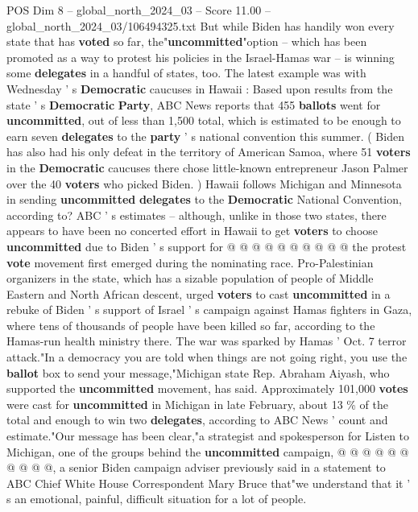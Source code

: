 \begin{textsample}{POS Dim 8 – global\_north\_2024\_03 – Score 11.00 – global\_north\_2024\_03/106494325.txt}  \label{ex:f8_pos_015}
But while Biden has handily won every state that has \textbf{voted} so far, the"\textbf{uncommitted}"option -- which has been promoted as a way to protest his policies in the Israel-Hamas war -- is winning some \textbf{delegates} in a handful of states, too.
The latest example was with Wednesday ' s \textbf{Democratic} caucuses in Hawaii : Based upon results from the state ' s \textbf{Democratic} \textbf{Party}, ABC News reports that 455 \textbf{ballots} went for \textbf{uncommitted}, out of less than 1,500 total, which is estimated to be enough to earn seven \textbf{delegates} to the \textbf{party} ' s national convention this summer. ( Biden has also had his only defeat in the territory of American Samoa, where 51 \textbf{voters} in the \textbf{Democratic} caucuses there chose little-known entrepreneur Jason Palmer over the 40 \textbf{voters} who picked Biden. ) Hawaii follows Michigan and Minnesota in sending \textbf{uncommitted} \textbf{delegates} to the \textbf{Democratic} National Convention, according to?
ABC ' s estimates -- although, unlike in those two states, there appears to have been no concerted effort in Hawaii to get \textbf{voters} to choose \textbf{uncommitted} due to Biden ' s support for @ @ @ @ @ @ @ @ @ @ the protest \textbf{vote} movement first emerged during the nominating race.
Pro-Palestinian organizers in the state, which has a sizable population of people of Middle Eastern and North African descent, urged \textbf{voters} to cast \textbf{uncommitted} in a rebuke of Biden ' s support of Israel ' s campaign against Hamas fighters in Gaza, where tens of thousands of people have been killed so far, according to the Hamas-run health ministry there.
The war was sparked by Hamas ' Oct. 7 terror attack."In a democracy you are told when things are not going right, you use the \textbf{ballot} box to send your message,"Michigan state Rep.
Abraham Aiyash, who supported the \textbf{uncommitted} movement, has said.
Approximately 101,000 \textbf{votes} were cast for \textbf{uncommitted} in Michigan in late February, about 13 \% of the total and enough to win two \textbf{delegates}, according to ABC News ' count and estimate."Our message has been clear,"a strategist and spokesperson for Listen to Michigan, one of the groups behind the \textbf{uncommitted} campaign, @ @ @ @ @ @ @ @ @ @, a senior Biden campaign adviser previously said in a statement to ABC Chief White House Correspondent Mary Bruce that"we understand that it ' s an emotional, painful, difficult situation for a lot of people.

\end{textsample}
